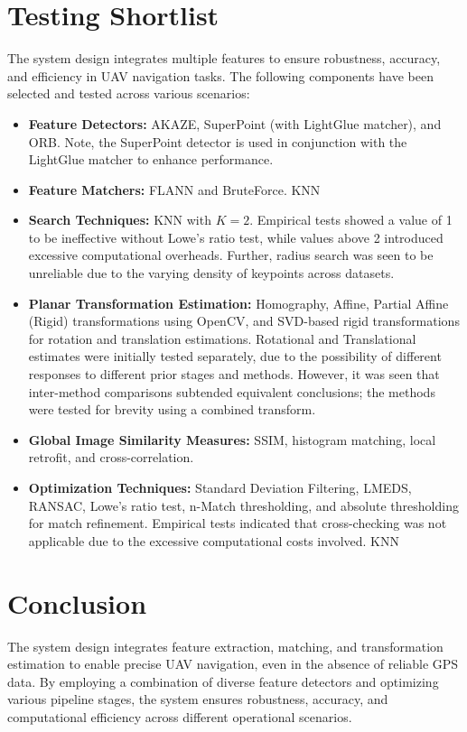 \section{Testing Shortlist}
\label{sec:testing_shortlist}

The system design integrates multiple features to ensure robustness, accuracy, and efficiency in UAV navigation tasks. The following components have been selected and tested across various scenarios:

\begin{itemize}
    \item \textbf{Feature Detectors:} AKAZE, SuperPoint (with LightGlue matcher), and ORB. Note, the SuperPoint detector is used in conjunction with the LightGlue matcher to enhance performance.
    \item \textbf{Feature Matchers:} FLANN and BruteForce. KNN 
    \item \textbf{Search Techniques:} KNN with \( K=2 \). Empirical tests showed a value of 1 to be ineffective without Lowe's ratio test, while values above 2 introduced excessive computational overheads. Further, radius search was seen to be unreliable due to the varying density of keypoints across datasets.
    \item \textbf{Planar Transformation Estimation:} Homography, Affine, Partial Affine (Rigid) transformations using OpenCV, and SVD-based rigid transformations for rotation and translation estimations. Rotational and Translational estimates were initially tested separately, due to the possibility of different responses to different prior stages and methods. However, it was seen that inter-method comparisons subtended equivalent conclusions; the methods were tested for brevity using a combined transform.
    \item \textbf{Global Image Similarity Measures:} SSIM, histogram matching, local retrofit, and cross-correlation.
    \item \textbf{Optimization Techniques:} Standard Deviation Filtering, LMEDS, RANSAC, Lowe's ratio test, n-Match thresholding, and absolute thresholding for match refinement. Empirical tests indicated that cross-checking was not applicable due to the excessive computational costs involved. KNN
\end{itemize}


\section{Conclusion}

The system design integrates feature extraction, matching, and transformation estimation to enable precise UAV navigation, even in the absence of reliable GPS data. By employing a combination of diverse feature detectors and optimizing various pipeline stages, the system ensures robustness, accuracy, and computational efficiency across different operational scenarios. 

